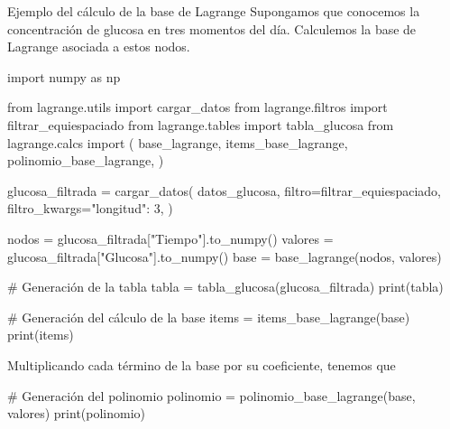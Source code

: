 \begin{frame}[fragile]{Ejemplo del cálculo de la base de Lagrange}
  Supongamos que conocemos la concentración de glucosa en tres momentos del
  día. Calculemos la \alert{base de Lagrange} asociada a estos nodos.

  \begin{multicols}{2}
    \begin{pycode}
      import numpy as np

      from lagrange.utils import cargar_datos
      from lagrange.filtros import filtrar_equiespaciado
      from lagrange.tables import tabla_glucosa
      from lagrange.calcs import (
        base_lagrange,
        items_base_lagrange,
        polinomio_base_lagrange,
      )

      glucosa_filtrada = cargar_datos(
        datos_glucosa,
        filtro=filtrar_equiespaciado,
        filtro_kwargs={"longitud": 3},
      )

      nodos = glucosa_filtrada["Tiempo"].to_numpy()
      valores = glucosa_filtrada["Glucosa"].to_numpy()
      base = base_lagrange(nodos, valores)
    \end{pycode}

    \begin{pycode}
      # Generación de la tabla
      tabla = tabla_glucosa(glucosa_filtrada)
      print(tabla)
    \end{pycode}

    \columnbreak

    \begin{pycode}
      # Generación del cálculo de la base
      items = items_base_lagrange(base)
      print(items)
    \end{pycode}
  \end{multicols}

  Multiplicando cada término de la base por su coeficiente, tenemos que
  \begin{pycode}
    # Generación del polinomio
    polinomio = polinomio_base_lagrange(base, valores)
    print(polinomio)
  \end{pycode}
\end{frame}
